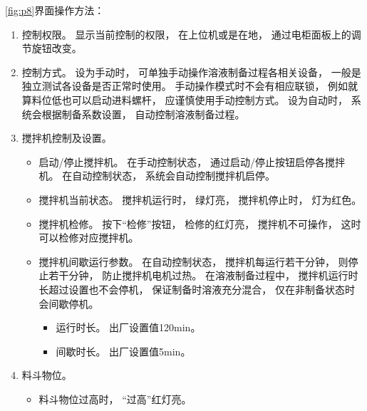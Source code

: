 \documentclass[UTF8,a4paper,12pt,titlepage]{ctexart}
\begin{document}
      \ref{fig:p8}界面操作方法：
      \begin{enumerate}
         \item 控制权限。
            显示当前控制的权限，
            在上位机或是在地，
            通过电柜面板上的调节旋钮改变。
         \item 控制方式。
            设为手动时，
            可单独手动操作溶液制备过程各相关设备，
            一般是独立测试各设备是否正常时使用。
            手动操作模式时不会有相应联锁，
            例如就算料位低也可以启动进料螺杆，
            应谨慎使用手动控制方式。
            设为自动时，
            系统会根据制备系数设置，
            自动控制溶液制备过程。
         \item 搅拌机控制及设置。
            \begin{itemize}
               \item 启动/停止搅拌机。
                  在手动控制状态，
                  通过启动/停止按钮启停各搅拌机。
                  在自动控制状态，
                  系统会自动控制搅拌机启停。
               \item 搅拌机当前状态。
                  搅拌机运行时，
                  绿灯亮，
                  搅拌机停止时，
                  灯为红色。
               \item 搅拌机检修。
                  按下“检修”按钮，
                  检修的红灯亮，
                  搅拌机不可操作，
                  这时可以检修对应搅拌机。
               \item 搅拌机间歇运行参数。
                  在自动控制状态，
                  搅拌机每运行若干分钟，
                  则停止若干分钟，
                  防止搅拌机电机过热。
                  在溶液制备过程中，
                  搅拌机运行时长超过设置也不会停机，
                  保证制备时溶液充分混合，
                  仅在非制备状态时会间歇停机。
                  \begin{itemize}
                     \item 运行时长。
                        出厂设置值120min。
                     \item 间歇时长。
                        出厂设置值5min。
                  \end{itemize}
            \end{itemize}
         \item 料斗物位。
            \begin{itemize}
                \item 料斗物位过高时，
                    “过高”红灯亮。

\end{itemize}
\end{enumerate}
\end{document}
